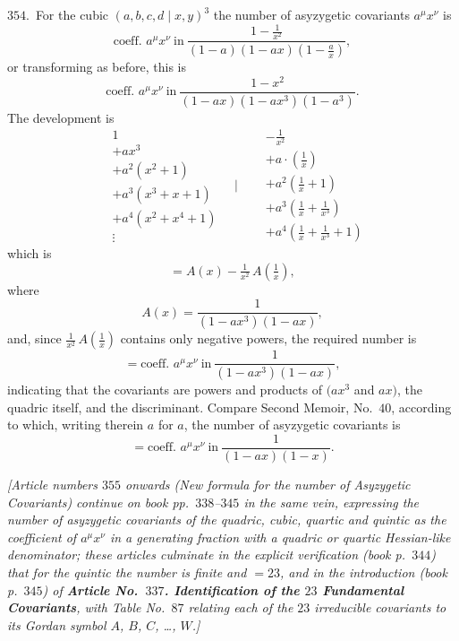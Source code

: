 \documentclass[11pt,a4paper]{article}
\providecommand{\midbar}{\mid}
\begin{document}
\noindent$354$.\ For the cubic $(a, b, c, d\!\midbar\! x, y)^{3}$ the
number of asyzygetic covariants $a^{\mu}x^{\nu}$ is
\[
\text{coeff.\ }a^{\mu}x^{\nu}\ \text{in}\
\frac{1 - \tfrac{1}{x^{2}}}{(1 - a)(1 - a x)\left(1 - \tfrac{a}{x}\right)},
\]
or transforming as before, this is
\[
\text{coeff.\ }a^{\mu}x^{\nu}\ \text{in}\
\frac{1 - x^{2}}{(1 - a x)(1 - a x^{3})(1 - a^{3})}.
\]
The development is
\[
\begin{aligned}
& 1\\
& + a x^{3}\\
& + a^{2}(x^{2} + 1)\\
& + a^{3}(x^{3} + x + 1)\\
& + a^{4}(x^{2} + x^{4} + 1)\\
& \vdots
\end{aligned}
\quad\Bigg|\quad
\begin{aligned}
& -\tfrac{1}{x^{2}}\\
& + a\!\cdot\!\left(\tfrac{1}{x}\right)\\
& + a^{2}\!\left(\tfrac{1}{x}+1\right)\\
& + a^{3}\!\left(\tfrac{1}{x}+\tfrac{1}{x^{3}}\right)\\
& + a^{4}\!\left(\tfrac{1}{x}+\tfrac{1}{x^{3}}+1\right)
\end{aligned}
\]
which is
\[
= A(x) - \tfrac{1}{x^{2}}\,A\!\left(\tfrac{1}{x}\right),
\]
where
\[
A(x) = \frac{1}{(1 - a x^{3})(1 - a x)},
\]
and, since $\tfrac{1}{x^{2}}\,A\!\left(\tfrac{1}{x}\right)$ contains only
negative powers, the required number is
\[
=\text{coeff.\ }a^{\mu}x^{\nu}\ \text{in}\
\frac{1}{(1 - a x^{3})(1 - a x)},
\]
indicating that the covariants are powers and products of $(a x^{3}$ and
$a x)$, the quadric itself, and the discriminant. Compare Second Memoir,
No.~$40$, according to which, writing therein $a$ for $a$, the number of
asyzygetic covariants is
\[
=\text{coeff.\ }a^{\mu}x^{\nu}\ \text{in}\
\frac{1}{(1 - a x)(1 - x)}.
\]

\noindent\textit{[Article numbers $355$ onwards (\textit{New formula for the
number of Asyzygetic Covariants}) continue on book pp.~$338$--$345$ in
the same vein, expressing the number of asyzygetic covariants of the
quadric, cubic, quartic and quintic as the coefficient of $a^{\mu}x^{\nu}$
in a generating fraction with a quadric or quartic Hessian-like
denominator; these articles culminate in the explicit verification (book
p.~$344$) that for the quintic the number is finite and $= 23$, and in
the introduction (book p.~$345$) of \textbf{Article No.~$337$. Identification
of the $23$ Fundamental Covariants}, with Table No.~$87$ relating each of
the $23$ irreducible covariants to its Gordan symbol $A$, $B$, $C$, \dots,
$W$.]}
\end{document}
